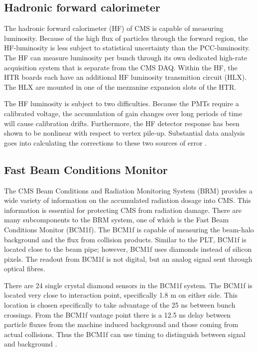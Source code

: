 \subsection{Hadronic forward calorimeter}

The hadronic forward calorimeter (HF) of CMS is capable of measuring luminosity. Because of the high flux of particles through the forward region, the HF-luminosity is less subject to statistical uncertainty than the PCC-luminosity. The HF can measure luminosity per bunch through its own dedicated high-rate acquisition system that is separate from the CMS DAQ. Within the HF, the HTR boards each have an additional HF luminosity transmition circuit (HLX). The HLX are mounted in one of the mezzanine expansion slots of the HTR.

The HF luminosity is subject to two difficulties. Because the PMTs require a calibrated voltage, the accumulation of gain changes over long periods of time will cause calibration drifts. Furthermore, the HF detector response has been shown to be nonlinear with respect to vertex pile-up. Substantial data analysis goes into calculating the corrections to these two sources of error \cite{CMS:2013gfa}.  

\subsection{Fast Beam Conditions Monitor}

The CMS Beam Conditions and Radiation Monitoring System (BRM) provides a wide variety of information on the accumulated radiation dosage into CMS. This information is essential for protecting CMS from radiation damage. There are many subcomponents to the BRM system, one of which is the Fast Beam Conditions Monitor (BCM1f). The BCM1f is capable of measuring the beam-halo background and the flux from collision products. Similar to the PLT, BCM1f is located close to the beam pipe; however, BCM1f uses diamonds instead of silicon pixels. The readout from BCM1f is not digital, but an analog signal sent through optical fibres. 

There are 24 single crystal diamond sensors in the BCM1f system. The BCM1f is located very close to interaction point, specifically 1.8 m on either side. This location is chosen specifically to take advantage of the 25 ns between bunch crossings. From the BCM1f vantage point there is a 12.5 ns delay between particle fluxes from the machine induced background and those coming from actual collisions. Thus the BCM1f can use timing to distinguish between signal and background \cite{Guthoff:2017ibf}.  

